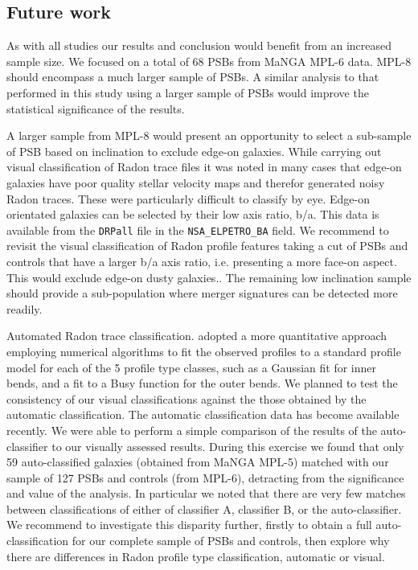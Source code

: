 \subsection{Future work}
\label{sec:future-work}
As with all studies our results and conclusion would benefit from an increased sample size. We focused on a total of 68 PSBs from MaNGA MPL-6 data. MPL-8 should encompass a much larger sample of PSBs. A similar analysis to that performed in this study using a larger sample of PSBs would improve the statistical significance of the results.

A larger sample from MPL-8  would present an opportunity to select a sub-sample of PSB based on inclination to exclude edge-on galaxies. While carrying out visual classification of Radon trace files it was noted in many cases that edge-on galaxies have poor quality stellar velocity maps and therefor generated noisy Radon traces. These were particularly difficult to classify by eye. Edge-on orientated galaxies can be selected by their low axis ratio, b/a. This data is available from the \texttt{DRPall} file in the \texttt{NSA\_ELPETRO\_BA} field. We recommend to revisit the visual classification of Radon profile features taking a cut of PSBs and controls that have a larger b/a axis ratio, i.e. presenting a  more face-on aspect. This would exclude edge-on dusty galaxies.. The remaining low inclination sample should provide a sub-population where merger signatures can be detected more readily.

Automated Radon trace classification. \cite{2018MNRAS.480.2217S} adopted a more quantitative approach employing numerical algorithms to fit the observed profiles to a standard profile model for each of the 5 profile type classes, such as a Gaussian fit for inner bends, and a fit to a Busy function \citep{2014ascl.soft02015W} for the outer bends. We planned to test the consistency of our visual classifications against the those obtained by the automatic classification. The automatic classification data has become available recently. We were able to perform a simple comparison of the results of the auto-classifier to our visually assessed results. During this exercise we found that only 59 auto-classified galaxies (obtained from MaNGA MPL-5) matched with our sample of 127 PSBs and controls (from MPL-6), detracting from the significance and value of the analysis. In particular we noted that there are very few matches between classifications of either of classifier A, classifier B, or the auto-classifier. We recommend to investigate this disparity further, firstly to obtain a full auto-classification for our complete sample of PSBs and controls, then explore why there are differences in Radon profile type classification, automatic or visual. 